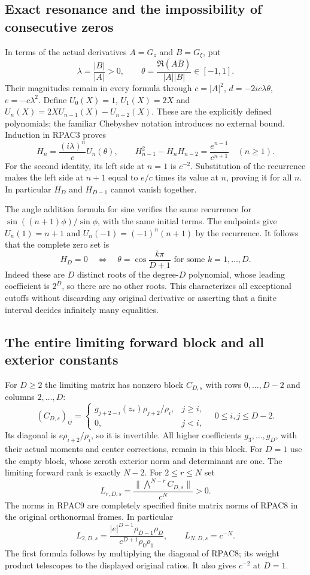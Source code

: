 \documentclass[11pt]{article}
\begin{document}
\subsection{Exact resonance and the impossibility of consecutive zeros}
In terms of the actual derivatives $A=G_z$ and $B=G_\xi$, put
\[
 \lambda=\frac{|B|}{|A|}>0,\qquad
 \theta=\frac{\Re(A\bar B)}{|A||B|}\in[-1,1].\tag{RPAC5}
\]
Their magnitudes remain in every formula through $c=|A|^2$,
$d=-2ic\lambda\theta$, $e=-c\lambda^2$.
Define $U_0(X)=1$, $U_1(X)=2X$ and
$U_n(X)=2XU_{n-1}(X)-U_{n-2}(X)$. These are the explicitly
defined polynomials; the familiar Chebyshev notation introduces
no external bound. Induction in RPAC3 proves
\[
 H_n=\frac{(i\lambda)^n}{c}U_n(\theta),\qquad
 H_{n-1}^2-H_nH_{n-2}=\frac{e^{n-1}}{c^{n+1}}
                      \quad(n\ge1).\tag{RPAC6}
\]
For the second identity, its left side at $n=1$ is $c^{-2}$.
Substitution of the recurrence makes the left side at $n+1$
equal to $e/c$ times its value at $n$, proving it for all $n$.
In particular $H_D$ and $H_{D-1}$ cannot vanish together.

The angle addition formula for sine verifies the same recurrence
for $\sin((n+1)\phi)/\sin\phi$, with the same initial terms.
The endpoints give $U_n(1)=n+1$ and
$U_n(-1)=(-1)^n(n+1)$ by the recurrence. It follows that the
complete zero set is
\[
 H_D=0\quad\Longleftrightarrow\quad
 \theta=\cos\frac{k\pi}{D+1}\text{ for some }k=1,\ldots,D.
 \tag{RPAC7}
\]
Indeed these are $D$ distinct roots of the degree-$D$ polynomial,
whose leading coefficient is $2^D$, so there are no other roots.
This characterizes all exceptional cutoffs without discarding any
original derivative or asserting that a finite interval decides
infinitely many equalities.

\subsection{The entire limiting forward block and all exterior constants}
For $D\ge2$ the limiting matrix has nonzero block $C_{D,s}$
with rows $0,\ldots,D-2$ and columns $2,\ldots,D$:
\[
 (C_{D,s})_{ij}=
 \begin{cases}g_{j+2-i}(z_*)\rho_{j+2}/\rho_i,&j\ge i,\\
 0,&j<i,
 \end{cases}\quad 0\le i,j\le D-2 .\tag{RPAC8}
\]
Its diagonal is $e\rho_{i+2}/\rho_i$, so it is invertible.
All higher coefficients $g_3,\ldots,g_D$, with their actual
moments and center corrections, remain in this block.
For $D=1$ use the empty block, whose zeroth exterior norm and
determinant are one. The limiting forward rank is exactly $N-2$.
For $2\le r\le N$ set
\[
 L_{r,D,s}=\frac{\|\bigwedge^{N-r}C_{D,s}\|}{c^N}>0.
 \tag{RPAC9}
\]
The norms in RPAC9 are completely specified finite matrix norms
of RPAC8 in the original orthonormal frames. In particular
\[
 L_{2,D,s}=\frac{|e|^{D-1}\rho_{D-1}\rho_D}
                    {c^{D+1}\rho_0\rho_1},\qquad
 L_{N,D,s}=c^{-N}.\tag{RPAC10}
\]
The first formula follows by multiplying the diagonal of RPAC8;
its weight product telescopes to the displayed original ratios.
It also gives $c^{-2}$ at $D=1$.
\end{document}
